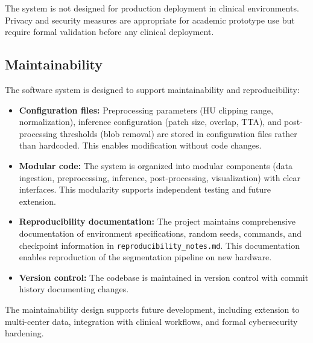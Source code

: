 The system is not designed for production deployment in clinical environments. Privacy and security measures are appropriate for academic prototype use but require formal validation before any clinical deployment.

\subsection{Maintainability}

The software system is designed to support maintainability and reproducibility:

\begin{itemize}
    \item \textbf{Configuration files:} Preprocessing parameters (HU clipping range, normalization), inference configuration (patch size, overlap, TTA), and post-processing thresholds (blob removal) are stored in configuration files rather than hardcoded. This enables modification without code changes.
    \item \textbf{Modular code:} The system is organized into modular components (data ingestion, preprocessing, inference, post-processing, visualization) with clear interfaces. This modularity supports independent testing and future extension.
    \item \textbf{Reproducibility documentation:} The project maintains comprehensive documentation of environment specifications, random seeds, commands, and checkpoint information in \texttt{reproducibility\_notes.md}. This documentation enables reproduction of the segmentation pipeline on new hardware.
    \item \textbf{Version control:} The codebase is maintained in version control with commit history documenting changes. %
\end{itemize}

The maintainability design supports future development, including extension to multi-center data, integration with clinical workflows, and formal cybersecurity hardening.
